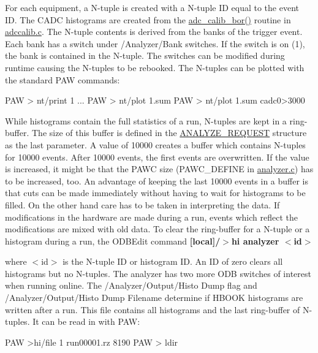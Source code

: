 For each equipment, a N-\/tuple is created with a N-\/tuple ID equal to the event ID. The CADC histograms are created from the \hyperlink{adccalib_8c_ad0c45258e6a5ff1cf274ca70e77cc2b1}{adc\_\-calib\_\-bor()} routine in \hyperlink{adccalib_8c}{adccalib.c}. The N-\/tuple contents is derived from the banks of the trigger event. Each bank has a switch under /Analyzer/Bank switches. If the switch is on (1), the bank is contained in the N-\/tuple. The switches can be modified during runtime causing the N-\/tuples to be rebooked. The N-\/tuples can be plotted with the standard PAW commands:


\begin{DoxyCode}
PAW > nt/print 1
...
PAW > nt/plot 1.sum
PAW > nt/plot 1.sum cadc0>3000
\end{DoxyCode}


\begin{center}  \end{center} 

While histograms contain the full statistics of a run, N-\/tuples are kept in a ring-\/buffer. The size of this buffer is defined in the \hyperlink{structANALYZE__REQUEST}{ANALYZE\_\-REQUEST} structure as the last parameter. A value of 10000 creates a buffer which contains N-\/tuples for 10000 events. After 10000 events, the first events are overwritten. If the value is increased, it might be that the PAWC size (PAWC\_\-DEFINE in \hyperlink{analyzer_8c}{analyzer.c}) has to be increased, too. An advantage of keeping the last 10000 events in a buffer is that cuts can be made immediately without having to wait for histograms to be filled. On the other hand care has to be taken in interpreting the data. If modifications in the hardware are made during a run, events which reflect the modifications are mixed with old data. To clear the ring-\/buffer for a N-\/tuple or a histogram during a run, the ODBEdit command {\bfseries  \mbox{[}local\mbox{]}/$>$hi analyzer $<$id$>$ }

where $<$id$>$ is the N-\/tuple ID or histogram ID. An ID of zero clears all histograms but no N-\/tuples. The analyzer has two more ODB switches of interest when running online. The /Analyzer/Output/Histo Dump flag and /Analyzer/Output/Histo Dump Filename determine if HBOOK histograms are written after a run. This file contains all histograms and the last ring-\/buffer of N-\/tuples. It can be read in with PAW:


\begin{DoxyCode}
PAW >hi/file 1 run00001.rz 8190
PAW > ldir
\end{DoxyCode}


